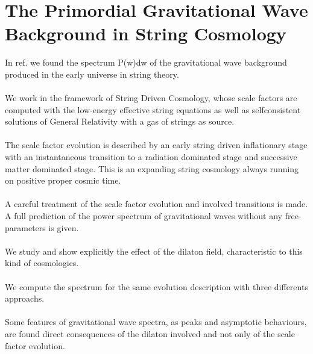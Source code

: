\documentclass[12pt,a4paper]{article}
\begin{document}
\section{The Primordial Gravitational Wave Background in String Cosmology}
In ref.\cite{is1} we found the spectrum P(w)dw of the gravitational wave background produced in 
the early universe in string theory.\\ \\
We work in the framework of String Driven Cosmology, whose scale factors are computed with the low-energy effective string equations as well as selfconsistent solutions of General Relativity with a gas of strings as source.\\ \\
The scale factor evolution is described by an early string driven inflationary stage with an instantaneous transition to a radiation dominated stage and 
successive matter dominated stage. This is an expanding string cosmology 
always running on positive proper cosmic time.\\ \\
A careful treatment of the scale factor evolution and involved transitions is made. A full prediction of the power spectrum of gravitational waves without 
any free-parameters is given.\\ \\
We study and show explicitly the effect of the dilaton field, characteristic 
to this kind of cosmologies.\\ \\
We compute the spectrum for the same evolution description with three 
differents approachs.\\ \\
Some features of gravitational wave spectra, as peaks and asymptotic 
behaviours, are found direct consequences of the dilaton involved and not 
only of the scale factor evolution.\\ \\
\end{document}
